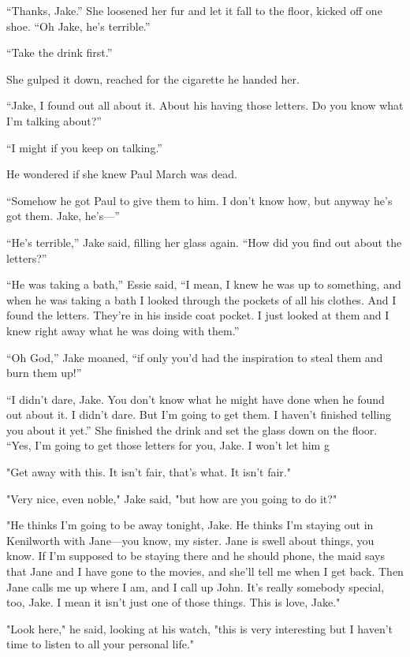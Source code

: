 \documentclass{novel}
\begin{document}
“Thanks, Jake.” She loosened her fur and let it fall to the floor, kicked off one shoe. “Oh Jake, he’s terrible.”

“Take the drink first.”

She gulped it down, reached for the cigarette he handed her.

“Jake, I found out all about it. About his having those letters. Do you know what I’m talking about?”

“I might if you keep on talking.”

He wondered if she knew Paul March was dead.

“Somehow he got Paul to give them to him. I don’t know how, but anyway he’s got them. Jake, he’s—”

“He’s terrible,” Jake said, filling her glass again. “How did you find out about the letters?”

“He was taking a bath,” Essie said, “I mean, I knew he was up to something, and when he was taking a bath I looked through the pockets of all his clothes. And I found the letters. They’re in his inside coat pocket. I just looked at them and I knew right away what he was doing with them.”

“Oh God,” Jake moaned, “if only you’d had the inspiration to steal them and burn them up!”

“I didn’t dare, Jake. You don’t know what he might have done when he found out about it. I didn’t dare. But I’m going to get them. I haven’t finished telling you about it yet.” She finished the drink and set the glass down on the floor. “Yes, I’m going to get those letters for you, Jake. I won’t let him g

"Get away with this. It isn't fair, that's what. It isn't fair."

"Very nice, even noble," Jake said, "but how are you going to do it?"

"He thinks I'm going to be away tonight, Jake. He thinks I'm staying out in Kenilworth with Jane—you know, my sister. Jane is swell about things, you know. If I'm supposed to be staying there and he should phone, the maid says that Jane and I have gone to the movies, and she'll tell me when I get back. Then Jane calls me up where I am, and I call up John. It's really somebody special, too, Jake. I mean it isn't just one of those things. This is love, Jake."

"Look here," he said, looking at his watch, "this is very interesting but I haven't time to listen to all your personal life."
\end{document}
